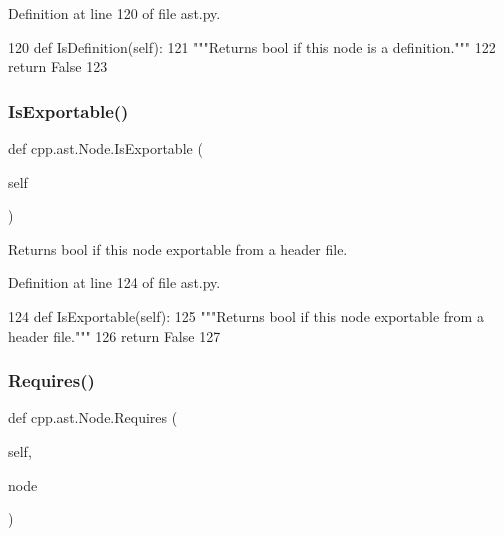 Definition at line 120 of file ast.\+py.


\begin{DoxyCode}
120     \textcolor{keyword}{def }IsDefinition(self):
121         \textcolor{stringliteral}{"""Returns bool if this node is a definition."""}
122         \textcolor{keywordflow}{return} \textcolor{keyword}{False}
123 
\end{DoxyCode}
\mbox{\label{classcpp_1_1ast_1_1Node_a313273874ccf578485006d4000128234}} 
\subsubsection{\texorpdfstring{Is\+Exportable()}{IsExportable()}}
{\footnotesize\ttfamily def cpp.\+ast.\+Node.\+Is\+Exportable (\begin{DoxyParamCaption}\item[{}]{self }\end{DoxyParamCaption})}

\begin{DoxyVerb}Returns bool if this node exportable from a header file.\end{DoxyVerb}
 

Definition at line 124 of file ast.\+py.


\begin{DoxyCode}
124     \textcolor{keyword}{def }IsExportable(self):
125         \textcolor{stringliteral}{"""Returns bool if this node exportable from a header file."""}
126         \textcolor{keywordflow}{return} \textcolor{keyword}{False}
127 
\end{DoxyCode}
\mbox{\label{classcpp_1_1ast_1_1Node_a31ae211f954a8c578ef16226df5ac8c8}} 
\subsubsection{\texorpdfstring{Requires()}{Requires()}}
{\footnotesize\ttfamily def cpp.\+ast.\+Node.\+Requires (\begin{DoxyParamCaption}\item[{}]{self,  }\item[{}]{node }\end{DoxyParamCaption})}

